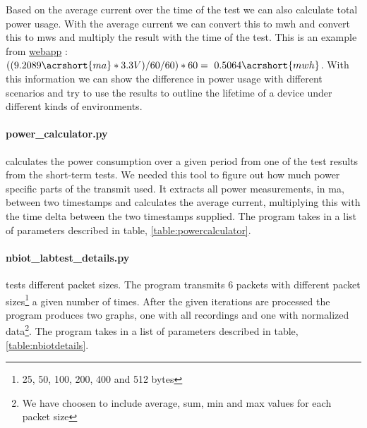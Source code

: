 \documentclass[USenglish]{ifimaster}  %
\begin{document}
Based on the average current over the time of the test we can also calculate total power usage. With the average current we can convert this to \acrshort{mwh} and convert this to \acrshort{mws} and multiply the result with the time of the test. This is an example from \href{http://158.39.77.97:9000/\#/results/UiO\_TELIA\_5.02\_precision\_2018-03-16\_1\_0x2\_60\_1\_512}{webapp} \cite{webapp:powerexample}: ${( (9.2089 \acrshort{ma} * 3.3V) / 60 / 60 ) * 60 = ~0.5064 \acrshort{mwh}}$. With this information we can show the difference in power usage with different scenarios and try to use the results to outline the lifetime of a device under different kinds of environments.

\paragraph{\textbf{power\_calculator.py}} calculates the power consumption over a given period from one of the test results from the short-term tests. We needed this tool to figure out how much power specific parts of the transmit used. It extracts all power measurements, in \acrshort{ma}, between two timestamps and calculates the average current, multiplying this with the time delta between the two timestamps supplied. The program takes in a list of parameters described in table, \vref{table:powercalculator}.

\begin{table}[H]
\centering
{}
\caption[\textbf{power\_calculator.py} parameters]{\textbf{power\_calculator.py} parameters. See \href{https://github.com/henninghaakonsen/thesis/blob/master/code/power_calculator.py}{power calculator}\cite{code:powercalc} for complete code}
\label{table:powercalculator}
\end{table}

\paragraph{\textbf{nbiot\_labtest\_details.py}} tests different packet sizes. The program transmits 6 packets with different packet sizes\footnote{25, 50, 100, 200, 400 and 512 bytes} a given number of times. After the given iterations are processed the program produces two graphs, one with all recordings and one with normalized data\footnote{We have choosen to include average, sum, min and max values for each packet size}. The program takes in a list of parameters described in table, \vref{table:nbiotdetails}.
\end{document}
